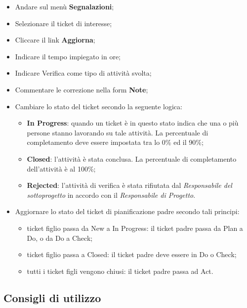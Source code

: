 \begin{itemize}
\item Andare sul men\`{u} \textbf{Segnalazioni}; 
\item Selezionare il ticket di interesse; 
\item Cliccare il link \textbf{Aggiorna}; 
\item Indicare il tempo impiegato in ore; 
\item Indicare Verifica come tipo di attivit\`{a} svolta; 
\item Commentare le correzione nella form \textbf{Note}; 
\item Cambiare lo stato del ticket secondo la seguente logica:
		\begin{itemize}
		\item \textbf{In Progress}: quando un ticket \`{e} in questo stato indica che una o pi\`{u} persone 
		stanno lavorando su tale attivit\`{a}. La percentuale di completamento deve 
		essere impostata tra lo 0\% ed il 90\%; 
		\item \textbf{Closed}: l’attivit\`{a} \`{e} stata conclusa. La percentuale di completamento dell’attivit\`{a} \`{e} al 100\%; 
		\item \textbf{Rejected}: l’attivit\`{a} di verifica \`{e} stata rifiutata dal \emph{Responsabile del sottoprogetto} in accordo con il \emph{Responsabile di Progetto}. 
		
		\end{itemize}

\item Aggiornare lo stato del ticket di pianificazione padre secondo tali principi:
		\begin{itemize}
		\item ticket figlio passa da New a In Progress: il ticket padre passa da Plan a Do, 
		o da Do a Check; 
		\item ticket figlio passa a Closed: il ticket padre deve essere in Do o Check; 
		\item tutti i ticket figli vengono chiusi: il ticket padre passa ad Act. 
		
		\end{itemize} 

\end{itemize} 




\subsection{Consigli di utilizzo}
